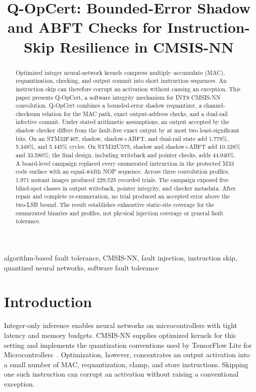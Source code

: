 \documentclass[conference]{IEEEtran}
\title{Q-OpCert: Bounded-Error Shadow and ABFT Checks for Instruction-Skip Resilience in CMSIS-NN}
\author{\IEEEauthorblockN{Anonymous Author(s)}}
\begin{document}
\maketitle

\begin{abstract}
Optimized integer neural-network kernels compress multiply--accumulate (MAC), requantization, checking, and output commit into short instruction sequences. An instruction skip can therefore corrupt an activation without causing an exception. This paper presents Q-OpCert, a software integrity mechanism for INT8 CMSIS-NN convolution. Q-OpCert combines a bounded-error shadow requantizer, a channel-checksum relation for the MAC path, exact output-address checks, and a dual-rail infective commit. Under stated arithmetic assumptions, an output accepted by the shadow checker differs from the fault-free exact output by at most two least-significant bits. On an STM32F407, shadow, shadow+ABFT, and dual-rail state add 1.778\%, 5.348\%, and 5.445\% cycles. On STM32U575, shadow and shadow+ABFT add 10.328\% and 33.580\%; the final design, including writeback and pointer checks, adds 44.040\%. A board-level campaign replaced every enumerated instruction in the protected M33 code surface with an equal-width NOP sequence. Across three convolution profiles, 1,971 mutant images produced 229,525 recorded trials. The campaign exposed five blind-spot classes in output writeback, pointer integrity, and checker metadata. After repair and complete re-enumeration, no trial produced an accepted error above the two-LSB bound. The result establishes exhaustive static-site coverage for the enumerated binaries and profiles, not physical injection coverage or general fault tolerance.
\end{abstract}

\begin{IEEEkeywords}
algorithm-based fault tolerance, CMSIS-NN, fault injection, instruction skip, quantized neural networks, software fault tolerance
\end{IEEEkeywords}

\section{Introduction}
Integer-only inference enables neural networks on microcontrollers with tight latency and memory budgets. CMSIS-NN supplies optimized kernels for this setting and implements the quantization conventions used by TensorFlow Lite for Microcontrollers~\cite{lai2018cmsisnn,jacob2018quantization,armcmsisnn}. Optimization, however, concentrates an output activation into a small number of MAC, requantization, clamp, and store instructions. Skipping one such instruction can corrupt an activation without raising a conventional exception.
\end{document}
